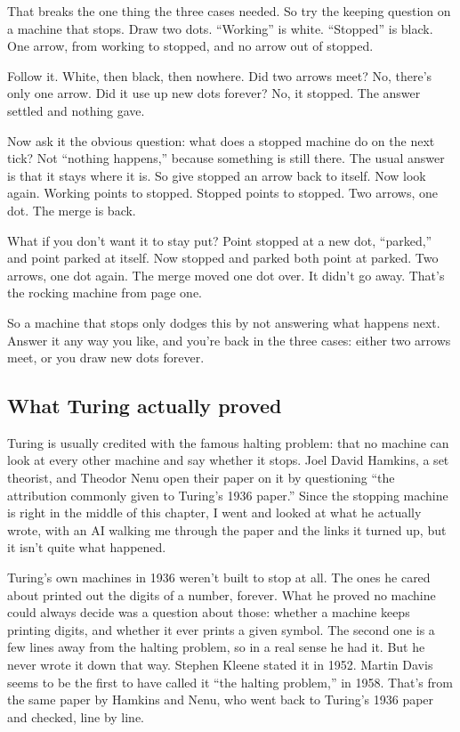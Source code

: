 \documentclass[11pt,twoside]{article}
\theoremstyle{thielethm}
\theoremstyle{thieledef}
\theoremstyle{thieledef}
\theoremstyle{thieledef}
\theoremstyle{thielethm}
\theoremstyle{thieleobs}
\theoremstyle{thielethm}
\begin{document}
That breaks the one thing the three cases needed. So try the keeping question on a machine that stops. Draw two dots. ``Working'' is white. ``Stopped'' is black. One arrow, from working to stopped, and no arrow out of stopped.

Follow it. White, then black, then nowhere. Did two arrows meet? No, there's only one arrow. Did it use up new dots forever? No, it stopped. The answer settled and nothing gave.

Now ask it the obvious question: what does a stopped machine do on the next tick? Not ``nothing happens,'' because something is still there. The usual answer is that it stays where it is. So give stopped an arrow back to itself. Now look again. Working points to stopped. Stopped points to stopped. Two arrows, one dot. The merge is back.

What if you don't want it to stay put? Point stopped at a new dot, ``parked,'' and point parked at itself. Now stopped and parked both point at parked. Two arrows, one dot again. The merge moved one dot over. It didn't go away. That's the rocking machine from page one.

So a machine that stops only dodges this by not answering what happens next. Answer it any way you like, and you're back in the three cases: either two arrows meet, or you draw new dots forever.

\subsection{What Turing actually proved}

Turing is usually credited with the famous halting problem: that no machine can look at every other machine and say whether it stops. Joel David Hamkins, a set theorist, and Theodor Nenu open their paper on it by questioning ``the attribution commonly given to Turing's 1936 paper.'' Since the stopping machine is right in the middle of this chapter, I went and looked at what he actually wrote, with an AI walking me through the paper and the links it turned up, but it isn't quite what happened.

Turing's own machines in 1936 weren't built to stop at all. The ones he cared about printed out the digits of a number, forever. What he proved no machine could always decide was a question about those: whether a machine keeps printing digits, and whether it ever prints a given symbol. The second one is a few lines away from the halting problem, so in a real sense he had it. But he never wrote it down that way. Stephen Kleene stated it in 1952. Martin Davis seems to be the first to have called it ``the halting problem,'' in 1958. That's from the same paper by Hamkins and Nenu, who went back to Turing's 1936 paper and checked, line by line.
\end{document}
